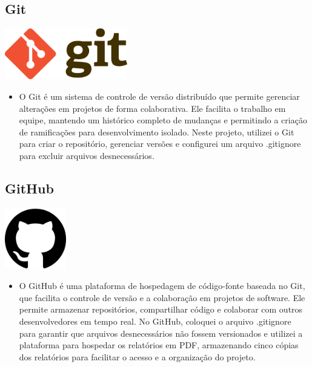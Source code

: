 \documentclass[a4paper,12pt]{article}
\begin{document}
\subsection{Git}
\includegraphics[width=0.4\textwidth]{git.svg.png}
    \vspace{1cm}
    \vspace{0.5cm}
    \begin{itemize}
        \item O Git é um sistema de controle de versão distribuído que permite gerenciar alterações em projetos de forma colaborativa. Ele facilita o trabalho em equipe, mantendo um histórico completo de mudanças e permitindo a criação de ramificações para desenvolvimento isolado. Neste projeto, utilizei o Git para criar o repositório, gerenciar versões e configurei um arquivo .gitignore para excluir arquivos desnecessários.
    \end{itemize}

\subsection{GitHub}
\includegraphics[width=0.2\textwidth]{github.png}
    \vspace{1cm}
    \vspace{0.5cm}
    \begin{itemize}
        \item O GitHub é uma plataforma de hospedagem de código-fonte baseada no Git, que facilita o controle de versão e a colaboração em projetos de software. Ele permite armazenar repositórios, compartilhar código e colaborar com outros desenvolvedores em tempo real. No GitHub, coloquei o arquivo .gitignore para garantir que arquivos desnecessários não fossem versionados e utilizei a plataforma para hospedar os relatórios em PDF, armazenando cinco cópias dos relatórios para facilitar o acesso e a organização do projeto.
    \end{itemize}
\end{document}
